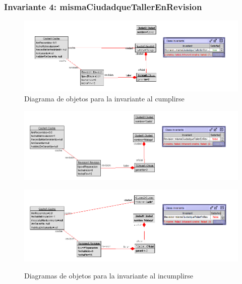 \documentclass[12pt.a4paper]{article}
\begin{document}
\subsubsection{Invariante 4: mismaCiudadqueTallerEnRevision}
    \begin{figure}[H]
         \centering
         \includegraphics[width=1\linewidth]{Soils/4.png}
         \caption{Diagrama de objetos para la invariante al cumplirse}
         \label{Diagrama_cumplimiento}
    \end{figure}

    
 \begin{figure}[H]
    \centering
    \begin{minipage}{0.49\textwidth}
        \centering
        \includegraphics[width=1\linewidth]{Soils/4_v2.png}
        \label{fig:diagrama1}
    \end{minipage}
    \hfill
    \begin{minipage}{0.49\textwidth}
        \centering
        \includegraphics[width=1\linewidth]{Soils/4_v3png.png}
        \label{fig:diagrama2}
    \end{minipage}
    \caption{Diagramas de objetos para la invariante al incumplirse}
    \label{fig:diagrama_invariante}
\end{figure}
\end{document}
